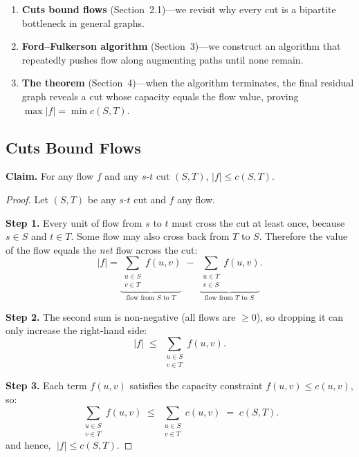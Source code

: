 \documentclass[11pt]{article}
\begin{document}
\begin{enumerate}
  \item \textbf{Cuts bound flows} (Section~2.1)---we revisit
        why every cut is a bipartite bottleneck in general graphs.
  \item \textbf{Ford--Fulkerson algorithm} (Section~3)---we
        construct an algorithm that repeatedly pushes flow along
        augmenting paths until none remain.
  \item \textbf{The theorem} (Section~4)---when the algorithm
        terminates, the final residual graph reveals a cut whose
        capacity equals the flow value, proving
        $\max |f| = \min c(S,T)$.
\end{enumerate}

\subsection{Cuts Bound Flows}

\textbf{Claim.} For any flow $f$ and any $s$-$t$ cut $(S,T)$,
$|f| \le c(S,T)$.

\begin{proof}
Let $(S,T)$ be any $s$-$t$ cut and $f$ any flow.

\medskip\noindent
\textbf{Step 1.}  Every unit of flow from $s$ to $t$ must cross
the cut at least once, because $s \in S$ and $t \in T$.  Some
flow may also cross back from $T$ to $S$.  Therefore the value
of the flow equals the \emph{net} flow across the cut:
\[
  |f|
  = \underbrace{\sum_{\substack{u \in S \\ v \in T}} f(u,v)
    }_{\text{flow from } S \text{ to } T}
  \;-\; \underbrace{\sum_{\substack{u \in T \\ v \in S}} f(u,v)
    }_{\text{flow from } T \text{ to } S}.
\]

\medskip\noindent
\textbf{Step 2.}  The second sum is non-negative (all flows are
$\ge 0$), so dropping it can only increase the right-hand side:
\[
  |f| \;\le\; \sum_{\substack{u \in S \\ v \in T}} f(u,v).
\]

\medskip\noindent
\textbf{Step 3.}  Each term $f(u,v)$ satisfies the capacity
constraint $f(u,v) \le c(u,v)$, so:
\[
  \sum_{\substack{u \in S \\ v \in T}} f(u,v)
  \;\le\; \sum_{\substack{u \in S \\ v \in T}} c(u,v)
  \;=\; c(S,T).
\]
\medskip\noindent
and hence, $\;|f| \le c(S,T)$.
\end{proof}
\end{document}
